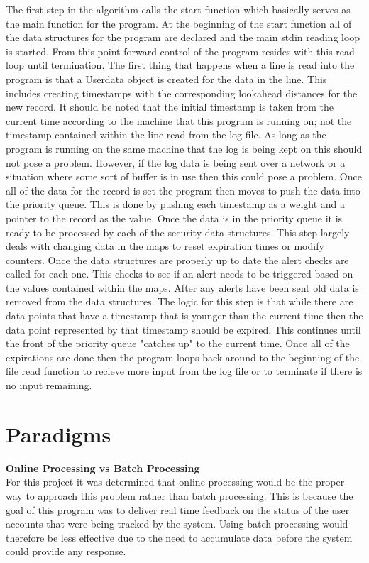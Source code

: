 \documentclass[12pt]{report}
\begin{document}
	\noindent
	The first step in the algorithm calls the start function which basically serves as the
	main function for the program. At the beginning of the start function all of the data structures
	for the program are declared and the main stdin reading loop is started. From this point 
	forward control of the program resides with this read loop until termination. The first thing
	that happens when a line is read into the program is that a Userdata object is created for the
	data in the line. This includes creating timestamps with the corresponding lookahead distances
	for the new record. It should be noted that the initial timestamp is taken from the current time
	according to the machine that this program is running on; not the timestamp contained within the
	line read from the log file. As long as the program is running on the same machine that the log
	is being kept on this should not pose a problem. However, if the log data is being sent over
	a network or a situation where some sort of buffer is in use then this could pose a problem.
	Once all of the data for the record is set the program then moves to push the data into the 
	priority queue. This is done by pushing each timestamp as a weight and a pointer to the record
	as the value. Once the data is in the priority queue it is ready to be processed by each of 
	the security data structures. This step largely deals with changing data in the maps to reset 
	expiration times or modify counters. Once the data structures are properly up to date the alert
	checks are called for each one. This checks to see if an alert needs to be triggered based on 
	the values contained within the maps. After any alerts have been sent old data is removed from
	the data structures. The logic for this step is that while there are data points that have a 
	timestamp that is younger than the current time then the data point represented by that 
	timestamp should be expired. This continues until the front of the priority queue "catches up"
	to the current time. Once all of the expirations are done then the program loops back around
	to the beginning of the file read function to recieve more input from the log file or to 
	terminate if there is no input remaining.

\section*{Paradigms}
	\noindent
	\textbf{Online Processing vs Batch Processing} \\
	For this project it was determined that online processing would be the 
	proper way to approach this problem rather than batch processing. This is
	because the goal of this program was to deliver real time feedback on the 
	status of the user accounts that were being tracked by the system. Using 
	batch processing would therefore be less effective due to the need to 
	accumulate data before the system could provide any response.
\end{document}
